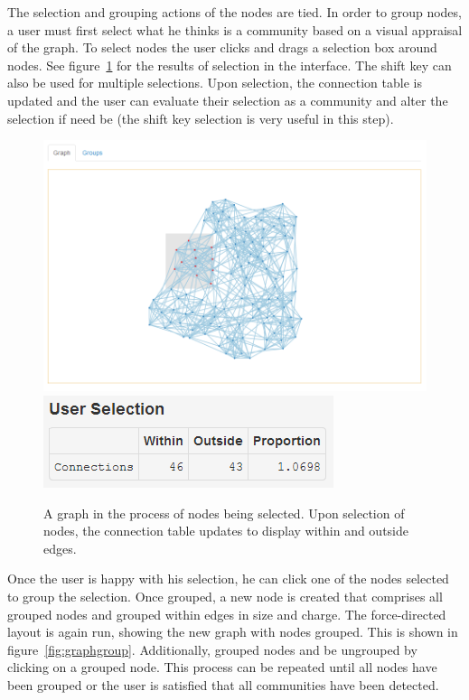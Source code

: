 \documentclass{article}
\begin{document}
The selection and grouping actions of the nodes are tied. In order to group nodes, a user must first select what he thinks is a community based on a visual appraisal of the graph. To select nodes the user clicks and drags a selection box around nodes. See figure~\ref{fig:graphselect} for the results of selection in the interface. The shift key can also be used for multiple selections. Upon selection, the connection table is updated and the user can evaluate their selection as a community and alter the selection if need be (the shift key selection is very useful in this step).

\begin{figure}[H]
\centering
\includegraphics[width=\textwidth]{images/graphselect.png}
\includegraphics[]{images/tableselect.png}
\caption{\label{fig:graphselect} A graph in the process of nodes being selected. Upon selection of nodes, the connection table updates to display within and outside edges.}
\end{figure}

Once the user is happy with his selection, he can click one of the nodes selected to group the selection. Once grouped, a new node is created that comprises all grouped nodes and grouped within edges in size and charge. The force-directed layout is again run, showing the new graph with nodes grouped. This is shown in figure~\ref{fig:graphgroup}. Additionally, grouped nodes and be ungrouped by clicking on a grouped node. This process can be repeated until all nodes have been grouped or the user is satisfied that all communities have been detected. 
\end{document}
